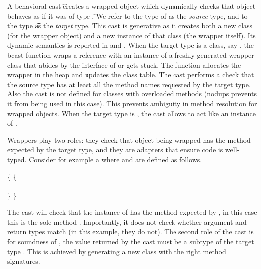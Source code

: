 \documentclass[a4paper,USenglish]{tex/lipics-v2016}
\begin{document}
A behavioral cast \BehCast\t\a creates a wrapped object \ap which
dynamically checks that object \a behaves as if it was of type \t.  We refer
to the type of \a as the \emph{source} type, and to the type \t as the
\emph{target} type. This cast is generative as it creates both a new class
(for the wrapper object) and a new instance of that class (the wrapper
itself). Its dynamic semantics is reported in  and
.  When the target type is a class, say \Cp, the bcast function
wraps a reference \a with an instance of a freshly generated wrapper class
\D that abides by the interface of \Cp or gets stuck. The function allocates
the wrapper in the heap and updates the class table.  The cast performs a
check that the source type has at least all the method names requested by
the target type.  Also the cast is not defined for classes with overloaded
methods (\textsf{nodups} prevents it from being used in this case).  This
prevents ambiguity in method resolution for wrapped objects. When the target
type is \any, the cast allows \a to act like an instance of \any.

Wrappers play two roles: they check that object being wrapped has the method
expected by the target type, and they are adapters that ensure \kafka code
is well-typed. Consider for example a \EM{\BehCast\D\New\C{}} where \C and
\D are defined as follows.

\begin{tabbing}
\hspace{1cm}\= \class\= \C \{    \hspace{3cm}\=  \class\=  \D \{\\
   \>  \> \Mdef\m\x\any\any\x   \>        \>  \Mdef\m\x\D\D\x\\
   \>  \}  \> \>                         \}
\end{tabbing}

\noindent
The cast will check that the instance of \C has the method expected by \D,
in this case this is the sole method \m.  Importantly, it does not check
whether argument and return types match (in this example, they do not). 
The second role of the cast is for soundness of \kafka, the value 
returned by the cast must be a subtype of the target type \D. This is 
achieved by generating a new class with the right method signatures.
\end{document}
